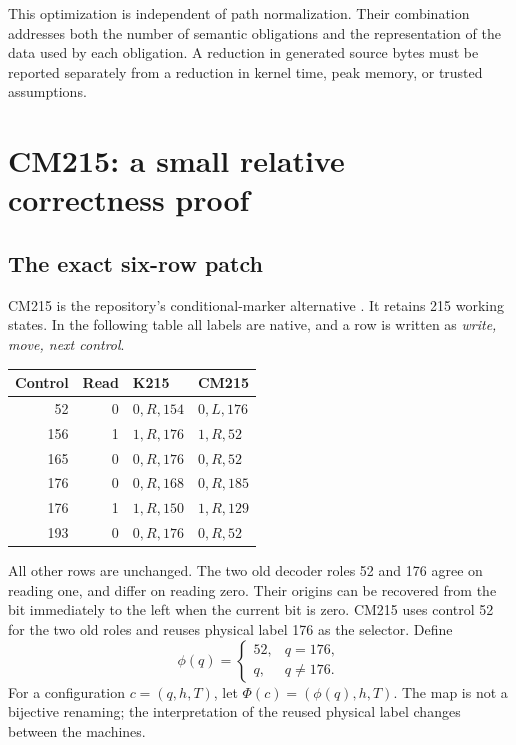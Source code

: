 \documentclass[11pt,letterpaper]{article}
\theoremstyle{definition}\newtheorem{definition}[theorem]{Definition}
\theoremstyle{remark}\newtheorem{remark}[theorem]{Remark}
\begin{document}
This optimization is independent of path normalization. Their combination
addresses both the number of semantic obligations and the representation
of the data used by each obligation. A reduction in generated source bytes
must be reported separately from a reduction in kernel time, peak memory,
or trusted assumptions.

\section{CM215: a small relative correctness proof}
\label{sec:marker}

\subsection{The exact six-row patch}

CM215 is the repository's conditional-marker alternative
\cite{marker}. It retains 215 working states. In the following table all
labels are native, and a row is written as \emph{write, move, next control}.

\begin{center}
\begin{tabular}{@{}rrll@{}}
\toprule
Control & Read & K215 & CM215\\\midrule
52 & 0 & $0,R,154$ & $0,L,176$\\
156 & 1 & $1,R,176$ & $1,R,52$\\
165 & 0 & $0,R,176$ & $0,R,52$\\
176 & 0 & $0,R,168$ & $0,R,185$\\
176 & 1 & $1,R,150$ & $1,R,129$\\
193 & 0 & $0,R,176$ & $0,R,52$\\\bottomrule
\end{tabular}
\end{center}

All other rows are unchanged. The two old decoder roles 52 and 176 agree
on reading one, and differ on reading zero. Their origins can be recovered
from the bit immediately to the left when the current bit is zero. CM215
uses control 52 for the two old roles and reuses physical label 176 as the
selector. Define
\[
 \phi(q)=\begin{cases}52,&q=176,\\q,&q\ne176.\end{cases}
\]
For a configuration $c=(q,h,T)$, let $\Phi(c)=(\phi(q),h,T)$.
The map is not a bijective renaming; the interpretation of the reused
physical label changes between the machines.
\end{document}
